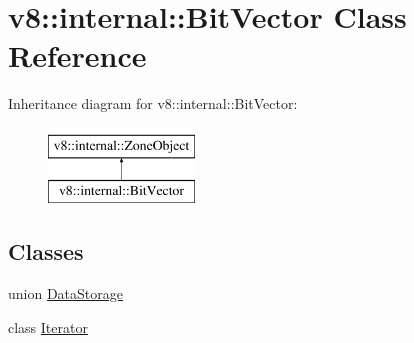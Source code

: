 \hypertarget{classv8_1_1internal_1_1BitVector}{}\section{v8\+:\+:internal\+:\+:Bit\+Vector Class Reference}
\label{classv8_1_1internal_1_1BitVector}
Inheritance diagram for v8\+:\+:internal\+:\+:Bit\+Vector\+:\begin{figure}[H]
\begin{center}
\leavevmode
\includegraphics[height=2.000000cm]{classv8_1_1internal_1_1BitVector}
\end{center}
\end{figure}
\subsection*{Classes}
\begin{DoxyCompactItemize}
\item 
union \mbox{\hyperlink{unionv8_1_1internal_1_1BitVector_1_1DataStorage}{Data\+Storage}}
\item 
class \mbox{\hyperlink{classv8_1_1internal_1_1BitVector_1_1Iterator}{Iterator}}
\end{DoxyCompactItemize}
